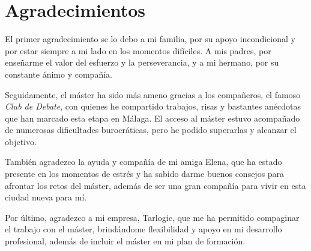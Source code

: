 
\chapter*{Agradecimientos}

El primer agradecimiento se lo debo a mi familia, por su apoyo incondicional y por estar siempre a mi lado en los momentos difíciles. A mis padres, por enseñarme el valor del esfuerzo y la perseverancia, y a mi hermano, por su constante ánimo y compañía.

Seguidamente, el máster ha sido más ameno gracias a los compañeros, el famoso \textit{Club de Debate}, con quienes he compartido trabajos, risas y bastantes anécdotas que han marcado esta etapa en Málaga. El acceso al máster estuvo acompañado de numerosas dificultades burocráticas, pero he podido superarlas y alcanzar el objetivo. 

También agradezco la ayuda y compañía de mi amiga Elena, que ha estado presente en los momentos de estrés y ha sabido darme buenos consejos para afrontar los retos del máster, además de ser una gran compañía para vivir en esta ciudad nueva para mí.

Por último, agradezco a mi empresa, Tarlogic, que me ha permitido compaginar el trabajo con el máster, brindándome flexibilidad y apoyo en mi desarrollo profesional, además de incluir el máster en mi plan de formación.

\blankpage